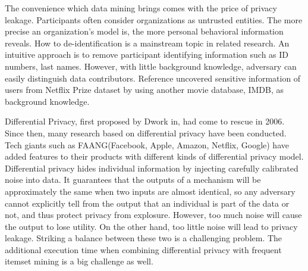 \documentclass[conference]{IEEEtran}
\begin{document}
The convenience which data mining brings comes with the price of privacy leakage. 
Participants often consider organizations as untrusted entities.
The more precise an organization's model is, the more personal behavioral information reveals. 
How to de-identification is a mainstream topic in related research.
An intuitive approach is to remove participant identifying information such as ID numbers, last names.
However, with little background knowledge, adversary can easily distinguish data contributors.
Reference \cite{b13} uncovered sensitive information of users from Netflix Prize dataset by using another movie database, IMDB, as background knowledge.

Differential Privacy, first proposed by Dwork in\cite{b4}, had come to rescue in 2006. 
Since then, many research based on differential privacy have been conducted. 
Tech giants such as FAANG(Facebook, Apple, Amazon, Netflix, Google) have added features to their products with different kinds of differential privacy model. 
Differential privacy hides individual information by injecting carefully calibrated noise into data. 
It guarantees that the outputs of a mechanism will be approximately the same when two inputs are almost identical, 
so any adversary cannot explicitly tell from the output that an individual is part of the data or not, and thus protect privacy from explosure. 
However, too much noise will cause the output to lose utility. On the other hand, too little noise will lead to privacy leakage.
Striking a balance between these two is a challenging problem. 
The additional execution time when combining differential privacy with frequent itemset mining is a big challenge as well.
\end{document}
